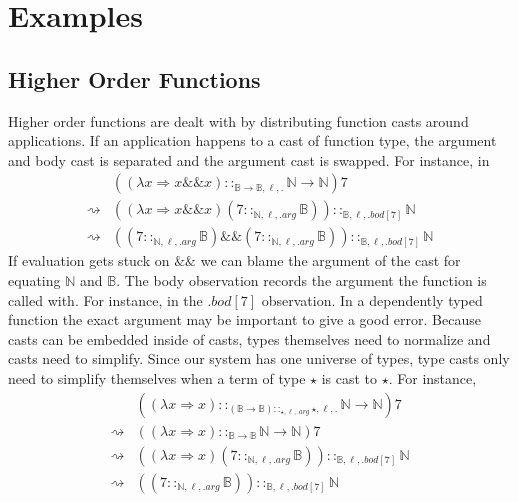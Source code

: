 \section{Examples}
 
\subsection{Higher Order Functions}
 
Higher order functions are dealt with by distributing function casts around applications.
If an application happens to a cast of function type, the argument and body cast is separated and the argument cast is swapped.
For instance, in
\begin{align*}
\, & \left(\left(\lambda x\Rightarrow x\&\&x\right)::_{\mathbb{B}\rightarrow\mathbb{B},\ell,.}\mathbb{N}\rightarrow\mathbb{N}\right)7\\
\rightsquigarrow & \left(\left(\lambda x\Rightarrow x\&\&x\right)\left(7::_{\mathbb{N},\ell,.arg}\mathbb{B}\right)\right)::_{\mathbb{B},\ell,.bod[7]}\mathbb{N}\\
\rightsquigarrow & \left(\left(7::_{\mathbb{N},\ell,.arg}\mathbb{B}\right)\&\&\left(7::_{\mathbb{N},\ell,.arg}\mathbb{B}\right)\right) ::_{\mathbb{B},\ell,.bod[7]}\mathbb{N}
\end{align*}
If evaluation gets stuck on $\&\&$ we can blame the argument of the cast for equating $\mathbb{N}$ and $\mathbb{B}$.
The body observation records the argument the function is called with.
For instance, in the $.bod[7]$ observation.
In a dependently typed function the exact argument may be important to give a good error.
Because casts can be embedded inside of casts, types themselves need to normalize and casts need to simplify.
Since our system has one universe of types, type casts only need to simplify themselves when a term of type $\star$ is cast to $\star$.
For instance,
\begin{align*}
\, & \left(\left(\lambda x\Rightarrow x\right)::_{\left(\mathbb{B}\rightarrow\mathbb{B}\right)::_{\star,\ell,.arg}\star,\ell,.}\mathbb{N}\rightarrow\mathbb{N}\right)7\\
\rightsquigarrow & \left(\left(\lambda x\Rightarrow x\right)::_{\mathbb{B}\rightarrow\mathbb{B}}\mathbb{N}\rightarrow\mathbb{N}\right)7\\
\rightsquigarrow & \left(\left(\lambda x\Rightarrow x\right)\left(7::_{\mathbb{N},\ell,.arg}\mathbb{B}\right)\right)::_{\mathbb{B},\ell,.bod[7]}\mathbb{N}\\
\rightsquigarrow & \left(\left(7::_{\mathbb{N},\ell,.arg}\mathbb{B}\right)\right)::_{\mathbb{B},\ell,.bod[7]}\mathbb{N}
\end{align*}
 
